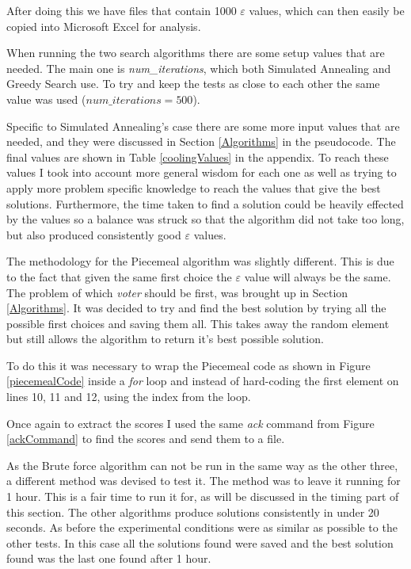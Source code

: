 \documentclass[12pt]{report}
\begin{document}
After doing this we have files that contain 1000 $\varepsilon$ values, which can then easily be copied into Microsoft Excel for analysis.

When running the two search algorithms there are some setup values that are needed. The main one is \textit{num\_iterations}, which both Simulated Annealing and Greedy Search use. To try and keep the tests as close to each other the same value was used ($num\_iterations = 500$).

Specific to Simulated Annealing's case there are some more input values that are needed, and they were discussed in Section \ref{Algorithms} in the pseudocode. The final values are shown in Table \ref{coolingValues} in the appendix. To reach these values I took into account more general wisdom for each one as well as trying to apply more problem specific knowledge to reach the values that give the best solutions. Furthermore, the time taken to find a solution could be heavily effected by the values so a balance was struck so that the algorithm did not take too long, but also produced consistently good $\varepsilon$ values.

The methodology for the Piecemeal algorithm was slightly different. This is due to the fact that given the same first choice the $\varepsilon$ value will always be the same. The problem of which \textit{voter} should be first, was brought up in Section \ref{Algorithms}. It was decided to try and find the best solution by trying all the possible first choices and saving them all. This takes away the random element but still allows the algorithm to return it's best possible solution.

To do this it was necessary to wrap the Piecemeal code as shown in Figure \ref{piecemealCode} inside a \textit{for} loop and instead of hard-coding the first element on lines 10, 11 and 12, using the index from the loop.

Once again to extract the scores I used the same \textit{ack} command from Figure \ref{ackCommand} to find the scores and send them to a file.

As the Brute force algorithm can not be run in the same way as the other three, a different method was devised to test it. The method was to leave it running for 1 hour. This is a fair time to run it for, as will be discussed in the timing part of this section. The other algorithms produce solutions consistently in under 20 seconds. As before the experimental conditions were as similar as possible to the other tests. In this case all the solutions found were saved and the best solution found was the last one found after 1 hour.
\end{document}
